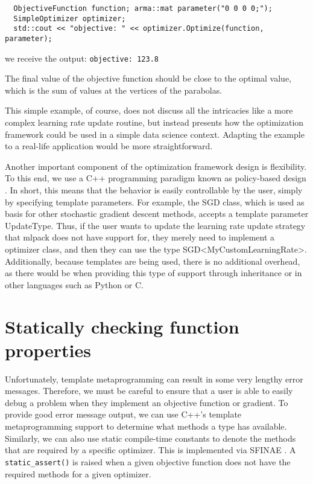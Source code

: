 \documentclass{article}
\begin{document}
\vspace*{-0.4em}
\begin{verbatim}
  ObjectiveFunction function; arma::mat parameter("0 0 0 0;");
  SimpleOptimizer optimizer;
  std::cout << "objective: " << optimizer.Optimize(function, parameter);
\end{verbatim}
\vspace*{-0.4em}

we receive the output: {\tt objective: 123.8 }

The final value of the objective function should be close to the optimal value,
which is the sum of values at the vertices of the parabolas.
\vspace*{-0.4em}

This simple example, of course, does not discuss all the intricacies like a more
complex learning rate update routine, but instead presents how the optimization
framework could be used in a simple data science context. Adapting the example
to a real-life application would be more straightforward.

Another important component of the optimization framework design is flexibility.
To this end, we use a C++ programming paradigm known as policy-based design
\cite{Alexandrescu2001}. In short, this means that the behavior is easily
controllable by the user, simply by specifying template parameters. For example,
the SGD class, which is used as basis for other stochastic gradient descent
methods, accepts a template parameter UpdateType. Thus, if the user wants to
update the learning rate update strategy that mlpack does not have support for,
they merely need to implement a optimizer class, and then they can use the type
SGD<MyCustomLearningRate>. Additionally, because templates are being used, there
is no additional overhead, as there would be when providing this type of support
through inheritance or in other languages such as Python or C.

\section{Statically checking function properties}
\label{sec:static}

Unfortunately, template metaprogramming can result in some very lengthy error
messages.  Therefore, we must be careful to ensure that a user is able to easily
debug a problem when they implement an objective function or gradient.  To
provide good error message output, we can use C++'s template metaprogramming
support to determine what methods a type has available.  Similarly, we can also
use static compile-time constants to denote the methods that are required by a
specific optimizer.  This is implemented via SFINAE
\cite{Vandevoorde2002sfinae}.  A {\tt static\_assert()} is raised when a given
objective function does not have the required methods for a given optimizer.
\end{document}
